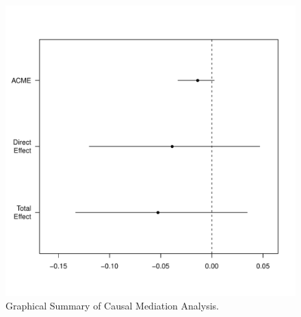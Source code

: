\documentclass[11pt,letterpaper]{article}
\theoremstyle{plain}
\begin{document}
\begin{figure}[t]
\vspace{-.5in}
\begin{center}
\includegraphics[scale=.8]{plot-mediate.pdf}
\end{center}
\vspace{-.5in}
\caption{Graphical Summary of Causal Mediation Analysis.
  \label{fig:plot.mediate}}
\end{figure}
\end{document}
